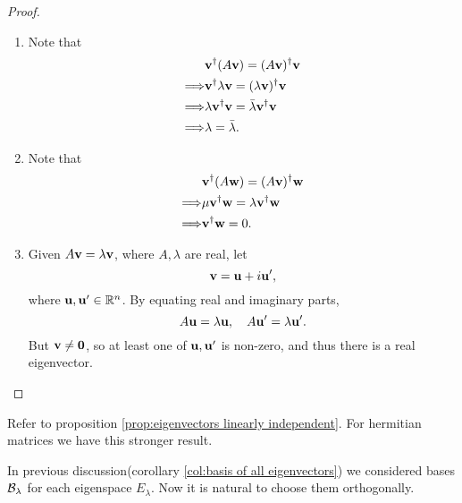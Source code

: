 \documentclass[10pt]{article}
\begin{document}
    \begin{proof}
        \begin{enumerate}
            \item Note that 
            \begin{align*}
                & {\bf v}^\dagger (A{\bf v})=(A{\bf v})^\dagger {\bf v}\\
                \Longrightarrow & {\bf v}^\dagger \lambda{\bf v} = (\lambda{\bf v})^\dagger {\bf v}\\
                \Longrightarrow & \lambda{\bf v}^\dagger {\bf v}=\bar{\lambda}{\bf v}^\dagger {\bf v}\\
                \Longrightarrow & \lambda=\bar{\lambda}.
            \end{align*}
            \item Note that 
            \begin{align*}
                &{\bf v}^\dagger (A{\bf w}) = (A{\bf v})^\dagger {\bf w}\\
                \Longrightarrow & \mu {\bf v}^\dagger {\bf w} = \lambda {\bf v}^\dagger {\bf w}\\
                \Longrightarrow & {\bf v}^\dagger {\bf w}=0.
            \end{align*}
            \item Given $ A{\bf v}=\lambda{\bf v} $, where $A,\lambda$ are real, let 
            \[
                {\bf v}={\bf u}+i{\bf u}',
            \]
            where $ {\bf u},{\bf u}'\in \mathbb{R}^{n} $. By equating real and imaginary parts,
            \[
                A{\bf u}=\lambda{\bf u},\quad A{\bf u}'=\lambda{\bf u}'.
            \]
            But $ {\bf v}\neq \mathbf{0} $, so at least one of $ {\bf u},{\bf u}' $ is non-zero, and thus there is a real eigenvector.
        \end{enumerate}
    \end{proof}
    \begin{remark}
        Refer to proposition \ref{prop:eigenvectors linearly independent}. For hermitian matrices we have this stronger result.
    \end{remark}
    In previous discussion(corollary \ref{col:basis of all eigenvectors}) we considered bases $ {\mathcal{B}}_{\lambda} $ for each eigenspace $ E_\lambda $. Now it is natural to choose them orthogonally.
\end{document}
